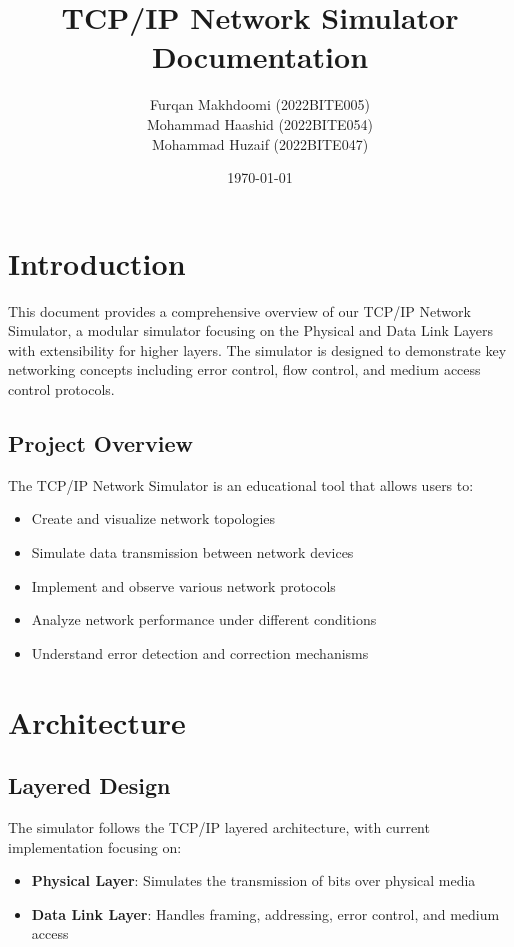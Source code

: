 \documentclass[12pt,a4paper]{article}
\title{TCP/IP Network Simulator\\
\large Documentation}
\author{Furqan Makhdoomi (2022BITE005)\\
Mohammad Haashid (2022BITE054)\\
Mohammad Huzaif (2022BITE047)}
\date{\today}
\begin{document}
\maketitle
\tableofcontents
\newpage

\section{Introduction}
This document provides a comprehensive overview of our TCP/IP Network Simulator, a modular simulator focusing on the Physical and Data Link Layers with extensibility for higher layers. The simulator is designed to demonstrate key networking concepts including error control, flow control, and medium access control protocols.

\subsection{Project Overview}
The TCP/IP Network Simulator is an educational tool that allows users to:
\begin{itemize}
    \item Create and visualize network topologies
    \item Simulate data transmission between network devices
    \item Implement and observe various network protocols
    \item Analyze network performance under different conditions
    \item Understand error detection and correction mechanisms
\end{itemize}

\section{Architecture}
\subsection{Layered Design}
The simulator follows the TCP/IP layered architecture, with current implementation focusing on:

\begin{itemize}
    \item \textbf{Physical Layer}: Simulates the transmission of bits over physical media
    \item \textbf{Data Link Layer}: Handles framing, addressing, error control, and medium access
\end{itemize}
\end{document}
